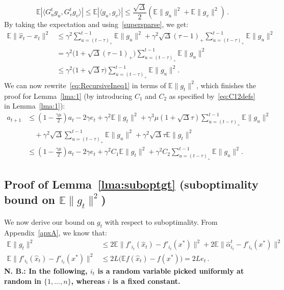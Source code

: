 \documentclass[twoside, 11pt]{article}
\newcommand{\stepsize}{\gamma}
\newcommand{\strongconvex}{\mu}
\newcommand{\overlap}{\tau}
\newcommand{\sparsity}{\Delta}
\newcommand{\lipschitz}{L}
\newcommand{\E}{\mathbb{E}}
\begin{document}
\begin{equation} \label{supersparse}
\E |\langle G_u^t g_{u}, G_v^t g_{v}\rangle |
\leq \E |\langle g_{u}, g_{v}\rangle |
\leq \frac{\sqrt{\sparsity}}{2}(\E\|g_{u}\|^2 + \E\|g_{v}\|^2) \, .
\end{equation}
By taking the expectation and using~\eqref{supersparse}, we get:
\begin{align}\label{eq:hatxtbound}
\E\|\hat x_t - x_t\|^2
&\leq \stepsize^2 \sum_{u=(t-\overlap)_+}^{t-1}\E\|g_{u}\|^2
	+ \stepsize^2 \sqrt{\sparsity}(\overlap-1)_+ \sum_{u=(t-\overlap)_+}^{t-1}\E\|g_{u}\|^2
\nonumber \\
&= \stepsize^2 \big(1+\sqrt{\sparsity}(\overlap-1)_+ \big)\sum_{u=(t-\overlap)_+}^{t-1}\E\|g_{u}\|^2
\nonumber \\
&\leq \stepsize^2 \big(1+\sqrt{\sparsity}\overlap \big)\sum_{u=(t-\overlap)_+}^{t-1}\E\|g_{u}\|^2 .
\end{align}
We can now rewrite~\eqref{eq:RecursiveIneq1} in terms of $\E\|g_t\| ^2$, which finishes the proof for Lemma~\ref{lma:1} (by introducing $C_1$ and $C_2$ as specified by~\ref{eq:C12defs} in Lemma~\ref{lma:1}):
\begin{align}
a_{t+1} &\leq
	(1 - \frac{\stepsize\strongconvex}{2}) a_t
	- 2\stepsize e_t
	+ \stepsize^2 \E\|g_t\|^2
	+ \stepsize^3 \strongconvex(1+\sqrt{\sparsity}\overlap)\sum_{u=(t-\overlap)_+}^{t-1}\E\|g_{u}\|^2
\nonumber \\
	&\quad + \stepsize^2 \sqrt{\sparsity}\sum_{u=(t-\overlap)_+}^{t-1}\E\|g_{u}\|^2
	+ \stepsize^2 \sqrt{\sparsity}\overlap\E\|g_t\|^2
\nonumber \\
&\leq (1 - \frac{\stepsize\strongconvex}{2}) a_t
	- 2\stepsize e_t
	+ \stepsize^2 C_1 \E\|g_t\|^2
	+ \stepsize^2 C_2 \sum_{u=(t-\overlap)_+}^{t-1}\E\|g_{u}\|^2 .
\end{align}
\hfill\BlackBox

\subsection{Proof of Lemma~\ref{lma:suboptgt} (suboptimality bound on $\E \|g_t\|^2$)} \label{apxB:lma2}
We now derive our bound on $g_t$ with respect to suboptimality.
From Appendix~\ref{apxA}, we know that:
\begin{align}
\E\|g_t\|^2
&\leq 2 \E \|f'_{i_t}(\hat x_t)-f'_{i_t}(x^*)\|^2
	+ 2 \E \|\hat \alpha_{i_t}^t - f'_{i_t}(x^*)\|^2 \label{eq:classicsaga}
\\
\E \|f'_{i_t}(\hat x_t)-f'_{i_t}(x^*)\|^2
&\leq 2\lipschitz\big(\E f(\hat x_t) - f(x^*)\big)
= 2\lipschitz e_t  \, . \label{eq:classicsaga2}
\end{align}
\textbf{N. B.: In the following, $i_t$ is a random variable picked uniformly at random in $\{1,...,n\}$, whereas $i$ is a fixed constant.}
\end{document}
